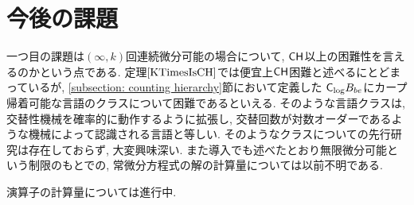 \section{今後の課題}
一つ目の課題は$(\infty, k)$回連続微分可能の場合について,
$\mathsf{CH}$以上の困難性を言えるのかという点である.
定理$\ref{KTimesIsCH}$では便宜上$\mathsf{CH}$困難と述べるにとどまっているが,
\ref{subsection: counting hierarchy}節において定義した
$\mathsf{C}_{\log} B_{be}$にカープ帰着可能な言語のクラスについて困難であるといえる.
そのような言語クラスは, 交替性機械を確率的に動作するように拡張し,
交替回数が対数オーダーであるような機械によって認識される言語と等しい.
そのようなクラスについての先行研究は存在しておらず, 大変興味深い.
また導入でも述べたとおり無限微分可能という制限のもとでの,
常微分方程式の解の計算量については以前不明である.

演算子の計算量については進行中.
